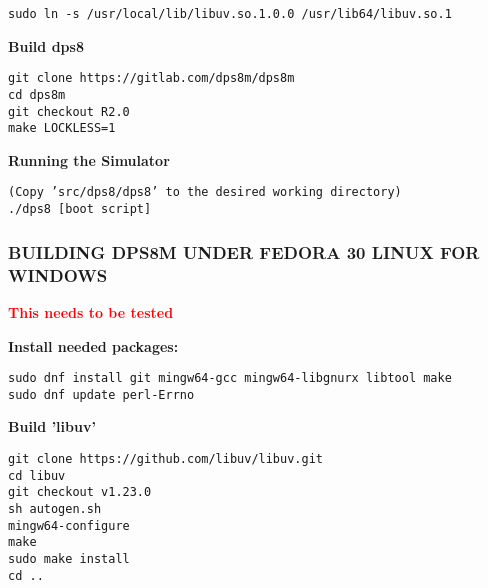 \begin{adjustwidth}{5ex}{1ex}
    \texttt{sudo ln -s /usr/local/lib/libuv.so.1.0.0 /usr/lib64/libuv.so.1} \\
\end{adjustwidth}  

\textbf{Build dps8}

\begin{adjustwidth}{5ex}{1ex}
    \texttt{git clone https://gitlab.com/dps8m/dps8m} \\
    \texttt{cd dps8m} \\
    \texttt{git checkout R2.0} \\
    \texttt{make LOCKLESS=1} \\
\end{adjustwidth}  

\textbf{Running the Simulator}

\begin{adjustwidth}{5ex}{1ex}
    \texttt{(Copy 'src/dps8/dps8' to the desired working directory)} \\
    \texttt{./dps8 [boot script]} \\
\end{adjustwidth}  

\newpage

\subsubsection[Building dps8m under Fedora 30 Linux For Windows]{BUILDING DPS8M UNDER FEDORA 30 LINUX FOR WINDOWS}

\textbf{\textcolor{red}{This needs to be tested}}

\textbf{Install needed packages:}

\begin{adjustwidth}{5ex}{1ex}
	\texttt{sudo dnf install git mingw64-gcc mingw64-libgnurx libtool make} \\
    \texttt{sudo dnf update perl-Errno} \\
\end{adjustwidth}  

\textbf{Build 'libuv'}

\begin{adjustwidth}{5ex}{1ex}
    \texttt{git clone https://github.com/libuv/libuv.git} \\
    \texttt{cd libuv} \\
    \texttt{git checkout v1.23.0} \\
    \texttt{sh autogen.sh} \\
    \texttt{mingw64-configure} \\
    \texttt{make} \\
    \texttt{sudo make install} \\
    \texttt{cd ..} \\
\end{adjustwidth}  

